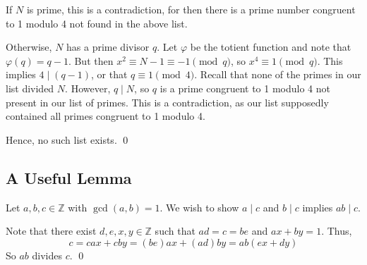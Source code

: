 \documentclass{article}
\newcommand{\Z}{\mathbb{Z}}
\begin{document}
  If $N$ is prime, this is a contradiction, for then there is a prime number
  congruent to 1 modulo 4 not found in the above list.

  Otherwise, $N$ has a prime divisor $q$. Let $\varphi$ be the totient function
  and note that $\varphi(q)=q-1$. But then $x^2\equiv N-1\equiv-1\pmod{q}$, so
  $x^4\equiv1\pmod{q}$. This implies $4\mid (q-1)$, or that $q\equiv1\pmod{4}$.
  Recall that none of the primes in our list divided $N$. However, $q\mid N$, so
  $q$ is a prime congruent to 1 modulo 4 not present in our list of primes. This
  is a contradiction, as our list supposedly contained all primes congruent to 1
  modulo 4.

  Hence, no such list exists.
  \qed

\subsection{A Useful Lemma}
  Let $a,b,c\in\Z$ with $\gcd(a,b)=1$. We wish to show $a\mid c$ and $b\mid c$
  implies $ab\mid c$.

  Note that there exist $d,e,x,y\in\Z$ such that $ad=c=be$ and $ax+by=1$. Thus,
  \begin{equation*}
    c = cax+cby=(be)ax+(ad)by=ab(ex+dy)
  \end{equation*}
  So $ab$ divides $c$.
  \qed
\end{document}
